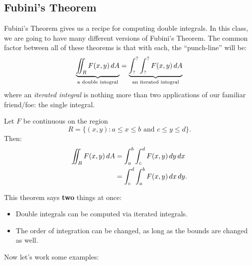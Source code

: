 \documentclass{ximera}
\begin{document}
\subsection{Fubini's Theorem}

Fubini's Theorem gives us a recipe for computing double integrals. In
this class, we are going to have many different versions of Fubini's
Theorem. The common factor between all of these theorems is that with
each, the ``punch-line'' will be:
\[
\underbrace{\iint_R F(x,y) \,d A}_{\text{a double integral}} = \underbrace{\int_?^? \int_?^? F(x,y) \,d A}_{\text{an iterated integral}}
\]
where an \textit{iterated integral} is
nothing more than two applications of our familiar friend/foe: the
single integral.


\begin{theorem}
  Let $F$ be continuous on the region
  \[
  R = \{(x,y):\text{$a\le x\le b$ and $c\le y\le d$}\}.
  \]
  Then:
  \begin{align*}
  \iint_R F(x,y) \,d A  &= \int_a^b\int_c^d F(x,y)\,d y\,d x\\
  &=\int_c^d\int_a^b F(x,y)\,d x\,d y.
  \end{align*}
\end{theorem}

\begin{remark}
  This theorem says \textbf{two} things at once:
  \begin{itemize}
  \item Double integrals can be computed via iterated integrals.
  \item The order of integration can be changed, as long as the bounds
    are changed as well.
  \end{itemize}
\end{remark}


Now let's work some examples:
\end{document}
